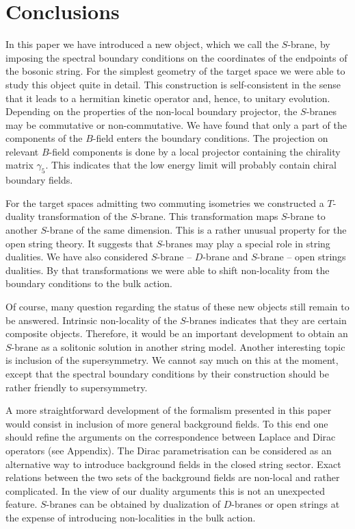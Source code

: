 \documentclass[a4paper,12pt,twoside]{article}
\begin{document}
\section{Conclusions}
In this paper we have introduced a new object, which we
call the $S$-brane, by imposing the spectral boundary conditions
on the coordinates of the endpoints of the bosonic string.
For the simplest geometry of the target space we were able
to study this object quite in detail. This construction
is self-consistent in the sense that it leads to a hermitian
kinetic operator and, hence, to unitary evolution. Depending on
the properties of the non-local boundary projector, the $S$-branes
may be commutative or non-commutative. We have found that only a part
of the components of the $B$-field enters the boundary conditions.
The projection on relevant $B$-field components is done by
a local projector containing the chirality matrix $\gamma_5$.
This indicates that the low energy limit will probably
contain chiral boundary fields.

For the target spaces admitting two commuting isometries
we constructed a $T$-duality transformation of the $S$-brane.
This transformation maps $S$-brane to another $S$-brane
of the same dimension.
This is a rather unusual property for the open string
theory. It suggests that $S$-branes may play a special
role in string dualities. We have also considered $S$-brane --
$D$-brane and $S$-brane -- open strings dualities. By that
transformations we were able to shift non-locality from the
boundary conditions to the bulk action.

Of course, many question regarding the status of these new
objects still remain to be answered. Intrinsic non-locality
of the $S$-branes indicates that they are certain composite
objects. Therefore, it would be an important development
to obtain an $S$-brane as a solitonic solution in another
string model. Another interesting topic is inclusion of the
supersymmetry. We cannot say much on this at the moment, 
except that the spectral boundary conditions by their
construction should be rather friendly to supersymmetry.

A more straightforward development of the formalism presented
in this paper would consist in inclusion of more general
background fields. To this end one should refine the
arguments on the correspondence between Laplace and Dirac
operators (see Appendix). The Dirac parametrisation can be
considered as an alternative way to introduce background
fields in the closed string sector. Exact relations between
the two sets of the background fields are non-local and
rather complicated. In the view of our duality arguments
this is not an unexpected feature. $S$-branes can be obtained
by dualization of $D$-branes or open strings at the expense
of introducing non-localities in the bulk action. 
\end{document}
